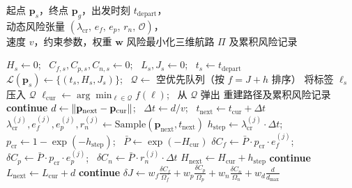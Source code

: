 \begin{algorithm}[htbp]
\caption{在线时间查询 TD-RiskA* 路径规划}
\label{alg:td-riska-star}
\begin{algorithmic}[1]
\Input 起点 $\mathbf{p}_s$，终点 $\mathbf{p}_g$，出发时刻 $t_{\mathrm{depart}}$，\\
\hspace*{1.8em} 动态风险张量 $(\lambda_{\mathrm{cr}},\, e_f,\, e_p,\, r_n,\, \mathcal{O})$，\\
\hspace*{1.8em} 速度 $v$，约束参数，权重 $\mathbf{w}$
\Output 风险最小化三维航路 $\Pi$ 及累积风险记录

\State $H_s \leftarrow 0$; \ $C_{f,s},C_{p,s},C_{n,s} \leftarrow 0$; \ $L_s,J_s \leftarrow 0$; \ $t_s \leftarrow t_{\mathrm{depart}}$
\State $\mathcal{L}(\mathbf{p}_s) \leftarrow \{(t_s, H_s, J_s)\}$; \ $\mathcal{Q} \leftarrow$ 空优先队列（按 $f=J+h$ 排序）
\State 将标签 $\ell_s$ 压入 $\mathcal{Q}$
    \State $\ell_{\mathrm{cur}} \leftarrow \arg\min_{\ell\in\mathcal{Q}} f(\ell)$; \ 从 $\mathcal{Q}$ 弹出
        \State \Return 重建路径及累积风险记录
    \EndIf
            \State \textbf{continue}
        \EndIf
        \State $d \leftarrow \left\lVert\mathbf{p}_{\mathrm{next}}-\mathbf{p}_{\mathrm{cur}}\right\rVert$; \ $\Delta t \leftarrow d/v$; \ $t_{\mathrm{next}} \leftarrow t_{\mathrm{cur}} + \Delta t$
        \State $\lambda_{\mathrm{cr}}^{(j)}, e_f^{(j)}, e_p^{(j)}, r_n^{(j)} \leftarrow \mathrm{Sample}(\mathbf{p}_{\mathrm{next}}, t_{\mathrm{next}})$
        \State $h_{\mathrm{step}} \leftarrow \lambda_{\mathrm{cr}}^{(j)} \cdot \Delta t$; \ $p_{\mathrm{cr}} \leftarrow 1 - \exp(-h_{\mathrm{step}})$; \ $\bar{P} \leftarrow \exp(-H_{\mathrm{cur}})$
        \State $\delta C_f \leftarrow \bar{P}\cdot p_{\mathrm{cr}}\cdot e_f^{(j)}$; \ $\delta C_p \leftarrow \bar{P}\cdot p_{\mathrm{cr}}\cdot e_p^{(j)}$; \ $\delta C_n \leftarrow \bar{P}\cdot r_n^{(j)}\cdot\Delta t$
        \State $H_{\mathrm{next}} \leftarrow H_{\mathrm{cur}} + h_{\mathrm{step}}$
            \State \textbf{continue} 
        \EndIf
        \State $L_{\mathrm{next}} \leftarrow L_{\mathrm{cur}} + d$
            \State \textbf{continue} 
        \EndIf
        \State $\delta J \leftarrow w_f\frac{\delta C_f}{\Omega_f} + w_p\frac{\delta C_p}{\Omega_p} + w_n\frac{\delta C_n}{\Omega_n} + w_d\frac{d}{d_{\max}}$

\end{algorithmic}
\end{algorithm}
